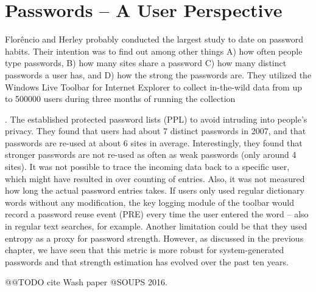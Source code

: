 \chapter[Passwords -- A User Perspective]{Passwords -- A User Perspective}\label{chap:selection_coping_strategies}


Flor\^{e}ncio and Herley probably conducted the largest study to date on password habits. Their intention was to find out among other things A) how often people type passwords, B) how many sites share a password C) how many distinct passwords a user has, and D) how the strong the passwords are. They utilized the Windows Live Toolbar for Internet Explorer to collect in-the-wild data from up to 500000 users during three months of running the collection

\cite{Florencio2007LargeScaleStudyPasswordHabits}. The established protected password lists (PPL) to avoid intruding into people's privacy. They found that users had about 7 distinct passwords in 2007, and that passwords are re-used at about 6 sites in average. Interestingly, they found that stronger passwords are not re-used as often as weak passwords (only around 4 sites). It was not possible to trace the incoming data back to a specific user, which might have resulted in over counting of entries. Also, it was not measured how long the actual password entries takes. If users only used regular dictionary words without any modification, the key logging module of the toolbar would record a password reuse event (PRE) every time the user entered the word -- also in regular text searches, for example. Another limitation could be that they used entropy as a proxy for password strength. However, as discussed in the previous chapter, we have seen that this metric is more robust for system-generated passwords and that strength estimation has evolved over the past ten years. 


@@TODO cite Wash paper @SOUPS 2016.

\cite{Bailey2014StatisticsReuse,Bojinov2010KamouflagePWM,Bonneau2015SecretsLies,Brown2004GeneratingPWs,Chiasson2009InterferencesGraphical,Conklin2004PWAuthenticationSystemPerspective,CSID2012PasswordHabits,Das2014TangledWeb,Dourish2004UserStrategiesEveryday,Florencio2014PasswordPortfoliosFiniteUser,Forget2015CYOA}
\cite{Gaw2005ReuseRecycle,Gaw2006PasswordManagement,Habib2017Blacklists,Haque2014Hierarchy,Hayashi2011DiaryStudyPWs,Huha2015UserReplaceablePasswords,Ives2004DominoEffectReuse,Katsini2017StrategiesGraphicalPasswords,Keith2009PassphraseDesign,Komanduri2011OfPasswordsAndPeople,Kothari2017PasswordLogbooks,Kuo2006HumanSelectionMnemonic,Li2017,Loutfi2015PasswordsOtherSideOfTheFence,Lyastani2016PWMangling,Notoatmodjo2007,Peisert2013PriciplesAuthentication,Riley2006WhatUsersKnowWhatTheyDo}
\cite{Shay2014ReligiousAunt,Shay2010EncounteringPasswordRequirements,Singh2007PasswordSharing,Stobert2014a,Stobert2015,Stobert2014PWMThatDoesntRemember,Stobert2014PasswordLifeCycle,Stobert2015ExpertPassword}
\cite{Ur2015PWCreationLab,Bruggen2013ModifiyngUnlockingBehavior,Veras2012VisualizingSemanticsPasswords,Wang2015ChinesePWs,Wash2016UnderstandingPasswordChoices,Yang2016MnemonicSentenceBased,ZhangKennedy2016RevisitingPasswordRules}

